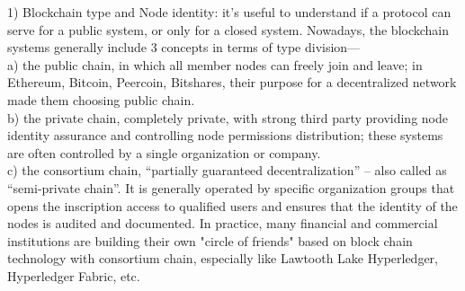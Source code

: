 \documentclass[doublespacing]{bmcart}
\begin{document}
\begin{CJK*}{UTF8}{gbsn}
1) Blockchain type and Node identity: it’s useful to understand if a protocol can serve for a public system, or only for a closed system. Nowadays, the blockchain systems generally include 3 concepts in terms of type division—
\\a)  the public chain, in which all member nodes can freely join and leave; in Ethereum, Bitcoin, Peercoin, Bitshares, their purpose for a decentralized network made them choosing public chain.
\\b) the private chain, completely private, with strong third party providing node identity assurance and controlling node permissions distribution; these systems are often controlled by a single organization or company.
\\c) the consortium chain, ``partially guaranteed decentralization'' – also called as ``semi-private chain''. It is generally operated by specific organization groups that opens the inscription access to qualified users and ensures that the identity of the nodes is audited and documented. In practice, many financial and commercial institutions are building their own "circle of friends" based on block chain technology with consortium chain, especially like Lawtooth Lake Hyperledger, Hyperledger Fabric, etc.



\end{CJK*}
\end{document}
